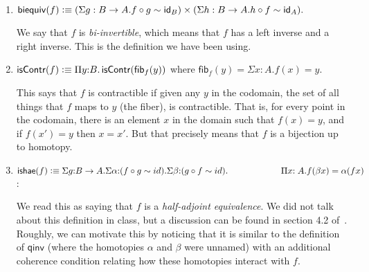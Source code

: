 \documentclass[11pt]{article}
\newcommand*{\isContr}{\mathsf{isContr}}
\newcommand{\qinv}{\mathsf{qinv}}
\newcommand*{\comp}{\mathbin{\circ}}
\newcommand{\biequiv}{\mathsf{biequiv}}
\newcommand{\isContrf}{\mathsf{isContr}}
\newcommand{\ishae}{\mathsf{ishae}}
\newcommand{\fib}{\mathsf{fib}}
\begin{document}
\begin{enumerate}
\item $\biequiv(f) \defeq (\Sigma g: B\to A.f\comp g \sim \id_B)\times (\Sigma h:
B\to A.h\comp f \sim \id_A).$

We say that $f$ is \emph{bi-invertible}, which means that $f$ has a left
inverse and a right inverse. This is the definition we have been using.

\medskip

\item $\isContrf(f) \defeq \Pi y{:}B.\, \isContr(\fib_f(y))$ where $\fib_f(y) =
\Sigma x{:}A. f(x) = y$.

This says that $f$ is contractible if given any $y$ in the codomain, the set of
all things that $f$ maps to $y$ (the fiber), is contractible. That is, for
every point in the codomain, there is an element $x$ in the domain such that
$f(x) = y$, and if $f(x') = y$ then $x = x'$. But that precisely means that $f$
is a bijection up to homotopy. 

\medskip
\item $\ishae(f) \defeq \Sigma g{:} B \to A. \Sigma \alpha{:} (f \comp g \sim id). \Sigma \beta{:} (g \comp f \sim id). \\ \smallskip \qquad \qquad \qquad \Pi x{:A}. f(\beta x) = \alpha(f x)  $:

We read this as saying that $f$ is a \emph{half-adjoint equivalence}. We did
not talk about this definition in class, but a discussion can be found in
section 4.2 of~\cite{HoTTBook2013}. Roughly, we can motivate this by noticing
that it is similar to the definition of $\qinv$ (where the homotopies $\alpha$
and $\beta$ were unnamed) with an additional coherence condition relating how
these homotopies interact with $f$.
\end{enumerate}




\end{document}
